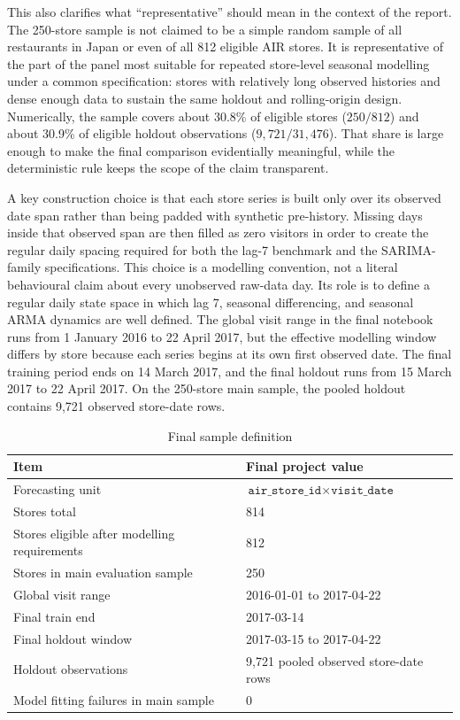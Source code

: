 \documentclass[11pt,oneside]{scrartcl}
\begin{document}
This also clarifies what ``representative'' should mean in the context of the report. The 250-store sample is not claimed to be a simple random sample of all restaurants in Japan or even of all 812 eligible AIR stores. It is representative of the part of the panel most suitable for repeated store-level seasonal modelling under a common specification: stores with relatively long observed histories and dense enough data to sustain the same holdout and rolling-origin design. Numerically, the sample covers about 30.8\% of eligible stores ($250/812$) and about 30.9\% of eligible holdout observations ($9{,}721/31{,}476$). That share is large enough to make the final comparison evidentially meaningful, while the deterministic rule keeps the scope of the claim transparent.

A key construction choice is that each store series is built only over its observed date span rather than being padded with synthetic pre-history. Missing days inside that observed span are then filled as zero visitors in order to create the regular daily spacing required for both the lag-7 benchmark and the SARIMA-family specifications. This choice is a modelling convention, not a literal behavioural claim about every unobserved raw-data day. Its role is to define a regular daily state space in which lag 7, seasonal differencing, and seasonal ARMA dynamics are well defined. The global visit range in the final notebook runs from 1 January 2016 to 22 April 2017, but the effective modelling window differs by store because each series begins at its own first observed date. The final training period ends on 14 March 2017, and the final holdout runs from 15 March 2017 to 22 April 2017. On the 250-store main sample, the pooled holdout contains 9{,}721 observed store-date rows.

\begin{table}[H]
\centering
\caption{Final sample definition}
\begin{tabular}{ll}
\toprule
Item & Final project value \\
\midrule
Forecasting unit & $\texttt{air\_store\_id} \times \texttt{visit\_date}$ \\
Stores total & 814 \\
Stores eligible after modelling requirements & 812 \\
Stores in main evaluation sample & 250 \\
Global visit range & 2016-01-01 to 2017-04-22 \\
Final train end & 2017-03-14 \\
Final holdout window & 2017-03-15 to 2017-04-22 \\
Holdout observations & 9{,}721 pooled observed store-date rows \\
Model fitting failures in main sample & 0 \\
\bottomrule
\end{tabular}
\end{table}
\end{document}
